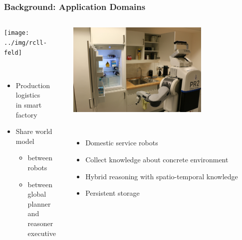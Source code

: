 \begin{frame}
  \frametitle{Background: Application Domains}
  \begin{columns}
    \begin{column}{0.5\textwidth}
    \begin{flushleft}
    \texttt{[image: ../img/rcll-feld]}
    \end{flushleft}
  \begin{description}[]
  \item[RoboCup Logistics League] \hfill \\
    \begin{itemize}
    \item Production logistics\\ in smart factory
    \item Share world model
    \begin{itemize}
    \item between robots
    \item between global planner and reasoner executive
    \end{itemize}
    \end{itemize}
  \end{description}
    \end{column}
    \begin{column}{0.5\textwidth}
    \pause
    \begin{flushright}
    \includegraphics[width=0.7\textwidth]{../img/pr2-kbsg-kitchen}
    \end{flushright}
  \begin{description}[]
  \item[RoboCup@Home] \hfill \\
    \begin{itemize}
    \item Domestic service robots
    \item Collect knowledge about concrete environment
    \item Hybrid reasoning with spatio-temporal knowledge
    \item Persistent storage
    \end{itemize}
  \end{description}    
    \end{column}
  \end{columns}
  
\end{frame}

